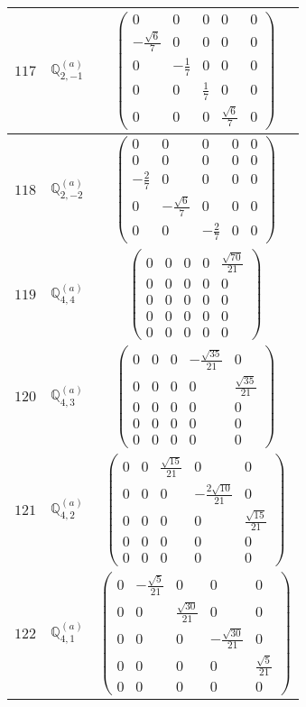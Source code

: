 \documentclass[fleqn,8pt,landscape]{jsarticle}
\begin{document}
\begin{center}
\begin{longtable}{ccc}
$ 117 $ & $ \mathbb{Q}_{2,-1}^{(a)} $ & $ \begin{pmatrix} 0 & 0 & 0 & 0 & 0 \\ - \frac{\sqrt{6}}{7} & 0 & 0 & 0 & 0 \\ 0 & - \frac{1}{7} & 0 & 0 & 0 \\ 0 & 0 & \frac{1}{7} & 0 & 0 \\ 0 & 0 & 0 & \frac{\sqrt{6}}{7} & 0 \end{pmatrix} $ \\ \hline
$ 118 $ & $ \mathbb{Q}_{2,-2}^{(a)} $ & $ \begin{pmatrix} 0 & 0 & 0 & 0 & 0 \\ 0 & 0 & 0 & 0 & 0 \\ - \frac{2}{7} & 0 & 0 & 0 & 0 \\ 0 & - \frac{\sqrt{6}}{7} & 0 & 0 & 0 \\ 0 & 0 & - \frac{2}{7} & 0 & 0 \end{pmatrix} $ \\ \hline
$ 119 $ & $ \mathbb{Q}_{4,4}^{(a)} $ & $ \begin{pmatrix} 0 & 0 & 0 & 0 & \frac{\sqrt{70}}{21} \\ 0 & 0 & 0 & 0 & 0 \\ 0 & 0 & 0 & 0 & 0 \\ 0 & 0 & 0 & 0 & 0 \\ 0 & 0 & 0 & 0 & 0 \end{pmatrix} $ \\ \hline
$ 120 $ & $ \mathbb{Q}_{4,3}^{(a)} $ & $ \begin{pmatrix} 0 & 0 & 0 & - \frac{\sqrt{35}}{21} & 0 \\ 0 & 0 & 0 & 0 & \frac{\sqrt{35}}{21} \\ 0 & 0 & 0 & 0 & 0 \\ 0 & 0 & 0 & 0 & 0 \\ 0 & 0 & 0 & 0 & 0 \end{pmatrix} $ \\ \hline
$ 121 $ & $ \mathbb{Q}_{4,2}^{(a)} $ & $ \begin{pmatrix} 0 & 0 & \frac{\sqrt{15}}{21} & 0 & 0 \\ 0 & 0 & 0 & - \frac{2 \sqrt{10}}{21} & 0 \\ 0 & 0 & 0 & 0 & \frac{\sqrt{15}}{21} \\ 0 & 0 & 0 & 0 & 0 \\ 0 & 0 & 0 & 0 & 0 \end{pmatrix} $ \\ \hline
$ 122 $ & $ \mathbb{Q}_{4,1}^{(a)} $ & $ \begin{pmatrix} 0 & - \frac{\sqrt{5}}{21} & 0 & 0 & 0 \\ 0 & 0 & \frac{\sqrt{30}}{21} & 0 & 0 \\ 0 & 0 & 0 & - \frac{\sqrt{30}}{21} & 0 \\ 0 & 0 & 0 & 0 & \frac{\sqrt{5}}{21} \\ 0 & 0 & 0 & 0 & 0 \end{pmatrix} $ \\ \hline

\end{longtable}
\end{center}
\end{document}
